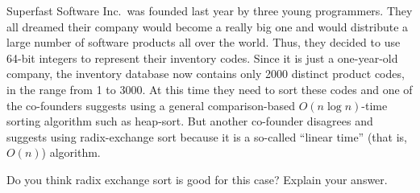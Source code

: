 Superfast Software Inc.\  was founded last year by three young
programmers. They all dreamed their company would become a really big
one and would distribute a large number of software products all over
the world.  Thus, they decided to use 64-bit integers to represent
their inventory codes. Since it is just a one-year-old company, the
inventory database now contains only 2000 distinct product codes, in
the range from 1 to 3000. At this time they need to sort these codes
and one of the co-founders suggests using a general comparison-based
$O(n \log  n)$-time sorting algorithm such as heap-sort.  But another
co-founder disagrees and suggests using radix-exchange sort because it
is a so-called ``linear time'' (that is, $O(n)$) algorithm.

Do you think radix exchange sort is good for this case? Explain your
answer.
